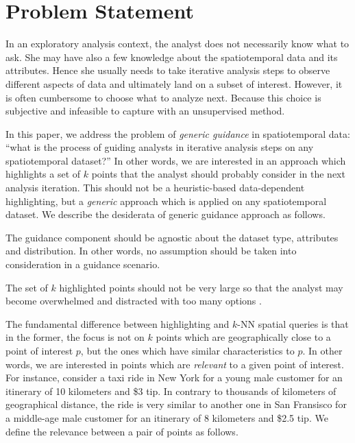 \section{Problem Statement}
\label{sec:pb}
In an exploratory analysis context, the analyst does not necessarily know what to ask. She may have also a few knowledge about the spatiotemporal data and its attributes. Hence she usually needs to take iterative analysis steps to observe different aspects of data and ultimately land on a subset of interest. However, it is often cumbersome to choose what to analyze next. Because this choice is subjective and infeasible to capture with an unsupervised method.

In this paper, we address the problem of {\em generic guidance} in spatiotemporal data: ``what is the process of guiding analysts in iterative analysis steps on any spatiotemporal dataset?'' In other words, we are interested in an approach which highlights a set of $k$ points that the analyst should probably consider in the next analysis iteration. This should not be a heuristic-based data-dependent highlighting, but a {\em generic} approach which is applied on any spatiotemporal dataset. We describe the desiderata of generic guidance approach as follows.

\vspace{5pt}
 The guidance component should be agnostic about the dataset type, attributes and distribution. In other words, no assumption should be taken into consideration in a guidance scenario.

\vspace{5pt}
 The set of $k$ highlighted points should not be very large so that the analyst may become overwhelmed and distracted with too many options \cite{miller1956human}.

\vspace{5pt}
 The fundamental difference between highlighting and $k$-NN spatial queries \cite{aly2015spatial} is that in the former, the focus is not on $k$ points which are geographically close to a point of interest $p$, but the ones which have similar characteristics to $p$. In other words, we are interested in points which are {\em relevant} to a given point of interest. For instance, consider a taxi ride in New York for a young male customer for an itinerary of 10 kilometers and \$3 tip. In contrary to thousands of kilometers of geographical distance, the ride is very similar to another one in San Fransisco for a middle-age male customer for an itinerary of 8 kilometers and \$2.5 tip.
We define the relevance between a pair of points as follows.

